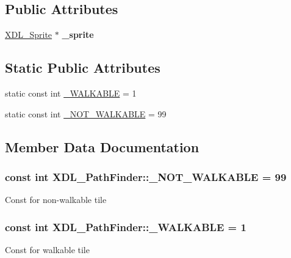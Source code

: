 \subsection*{Public Attributes}
\begin{DoxyCompactItemize}
\item 
\hypertarget{class_x_d_l___path_finder_ae21d6af420119875362d125ebf5c73b6}{\hyperlink{class_x_d_l___sprite}{X\-D\-L\-\_\-\-Sprite} $\ast$ {\bfseries \-\_\-sprite}}\label{class_x_d_l___path_finder_ae21d6af420119875362d125ebf5c73b6}

\end{DoxyCompactItemize}
\subsection*{Static Public Attributes}
\begin{DoxyCompactItemize}
\item 
static const int \hyperlink{class_x_d_l___path_finder_a5b9e836a10153d89aeb75c70954937c9}{\-\_\-\-W\-A\-L\-K\-A\-B\-L\-E} = 1
\item 
static const int \hyperlink{class_x_d_l___path_finder_a1d174e5bc28dc523833b199f79fbfc8f}{\-\_\-\-N\-O\-T\-\_\-\-W\-A\-L\-K\-A\-B\-L\-E} = 99
\end{DoxyCompactItemize}


\subsection{Member Data Documentation}
\hypertarget{class_x_d_l___path_finder_a1d174e5bc28dc523833b199f79fbfc8f}{
\subsubsection[{\-\_\-\-N\-O\-T\-\_\-\-W\-A\-L\-K\-A\-B\-L\-E}]{\setlength{\rightskip}{0pt plus 5cm}const int X\-D\-L\-\_\-\-Path\-Finder\-::\-\_\-\-N\-O\-T\-\_\-\-W\-A\-L\-K\-A\-B\-L\-E = 99\hspace{0.3cm}{\ttfamily [static]}}}\label{class_x_d_l___path_finder_a1d174e5bc28dc523833b199f79fbfc8f}
Const for non-\/walkable tile \hypertarget{class_x_d_l___path_finder_a5b9e836a10153d89aeb75c70954937c9}{
\subsubsection[{\-\_\-\-W\-A\-L\-K\-A\-B\-L\-E}]{\setlength{\rightskip}{0pt plus 5cm}const int X\-D\-L\-\_\-\-Path\-Finder\-::\-\_\-\-W\-A\-L\-K\-A\-B\-L\-E = 1\hspace{0.3cm}{\ttfamily [static]}}}\label{class_x_d_l___path_finder_a5b9e836a10153d89aeb75c70954937c9}
Const for walkable tile 


